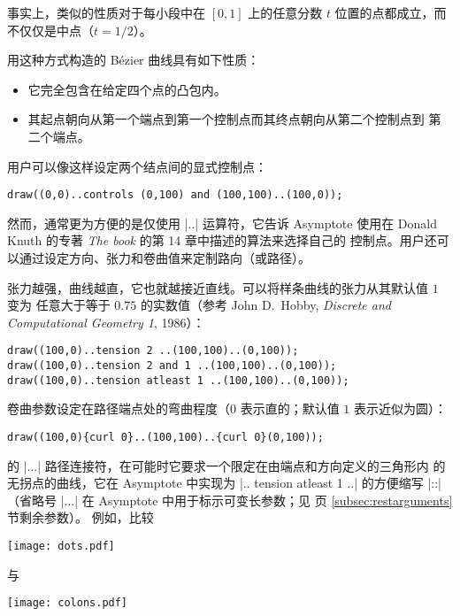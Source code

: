 \documentclass{ctexbook}
\newcommand*\prgname[1]{\textsf{#1}}
\begin{document}
事实上，类似的性质对于每小段中在 $[0,1]$ 上的任意分数 $t$ 位置的点都成立，而
不仅仅是中点（$t=1/2$）。

用这种方式构造的 Bézier 曲线具有如下性质：
\begin{itemize}
  \item 它完全包含在给定四个点的凸包内。
  \item 其起点朝向从第一个端点到第一个控制点而其终点朝向从第二个控制点到
    第二个端点。
\end{itemize}

用户可以像这样设定两个结点间的显式控制点：
\begin{lstlisting}
draw((0,0)..controls (0,100) and (100,100)..(100,0));
\end{lstlisting}

然而，通常更为方便的是仅使用 |..| 运算符，它告诉 \prgname{Asymptote} 使用在
Donald Knuth 的专著 \textit{The \MF{}book} 的第 14 章中描述的算法来选择自己的
控制点。用户还可以通过设定方向、张力和卷曲值来定制路向（或路径）。

张力越强，曲线越直，它也就越接近直线。可以将样条曲线的张力从其默认值 $1$ 变为
任意大于等于 $0.75$ 的实数值（参考 John D.~Hobby, \textit{Discrete and
Computational Geometry 1}, 1986）：
\begin{lstlisting}
draw((100,0)..tension 2 ..(100,100)..(0,100));
draw((100,0)..tension 2 and 1 ..(100,100)..(0,100));
draw((100,0)..tension atleast 1 ..(100,100)..(0,100));
\end{lstlisting}

卷曲参数设定在路径端点处的弯曲程度（$0$ 表示直的；默认值 $1$ 表示近似为圆）：
\begin{lstlisting}
draw((100,0){curl 0}..(100,100)..{curl 0}(0,100));
\end{lstlisting}

\MP{} 的 |...| 路径连接符，在可能时它要求一个限定在由端点和方向定义的三角形内
的无拐点的曲线，它在 \prgname{Asymptote} 中实现为 |.. tension atleast 1 ..|
的方便缩写 |::|（省略号 |...| 在 \prgname{Asymptote} 中用于标示可变长参数；见
\pageref{subsec:restarguments} 页 \ref{subsec:restarguments} 节剩余参数）。
例如，比较

\begin{center}
  \texttt{[image: dots.pdf]}
\end{center}
与

\begin{center}
  \texttt{[image: colons.pdf]}
\end{center}
\end{document}
